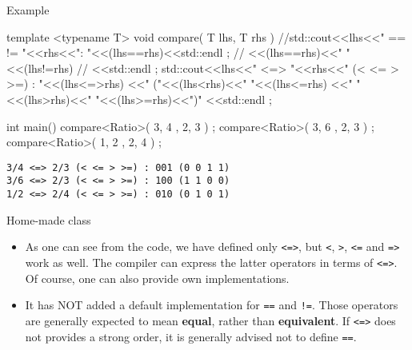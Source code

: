 \begin{frame}[fragile]
  \begin{exampleblock}{Example}
    \scriptsize
    \begin{cppcode*}{}
    template <typename T>
    void compare( T lhs, T rhs )
     {
      //std::cout<<lhs<<" == != "<<rhs<<": "<<(lhs==rhs)<<std::endl ;
      //  <<(lhs==rhs)<<" "<<(lhs!=rhs)
      //  <<std::endl ;
      std::cout<<lhs<<" <=> "<<rhs<<" (< <= > >=) : "<<(lhs<=>rhs)
        <<" ("<<(lhs<rhs)<<" "<<(lhs<=rhs)
        <<" "<<(lhs>rhs)<<" "<<(lhs>=rhs)<<")"
        <<std::endl ;
     }

    int main()
     {
      compare<Ratio>({ 3, 4 },{ 2, 3 }) ;
      compare<Ratio>({ 3, 6 },{ 2, 3 }) ;
      compare<Ratio>({ 1, 2 },{ 2, 4 }) ;
     }
     \end{cppcode*}
  \end{exampleblock}
  \begin{Verbatim}
3/4 <=> 2/3 (< <= > >=) : 001 (0 0 1 1)
3/6 <=> 2/3 (< <= > >=) : 100 (1 1 0 0)
1/2 <=> 2/4 (< <= > >=) : 010 (0 1 0 1)
  \end{Verbatim}
\end{frame}

\begin{frame}[fragile]
  \begin{block}{Home-made class}
    \begin{itemize}
      \item As one can see from the code, we have defined only \texttt{<=>}, but \texttt{<}, \texttt{>}, \texttt{<=} and \texttt{=>} work as well. The compiler can express the latter operators in terms of \texttt{<=>}. Of course, one can also provide own implementations.
      \item It has NOT added a default implementation for \texttt{==} and \texttt{!=}. Those operators are generally expected to mean \textbf{equal}, rather than \textbf{equivalent}. If \texttt{<=>} does not provides a strong order, it is generally advised not to define \texttt{==}.
    \end{itemize}
  \end{block}
\end{frame}

